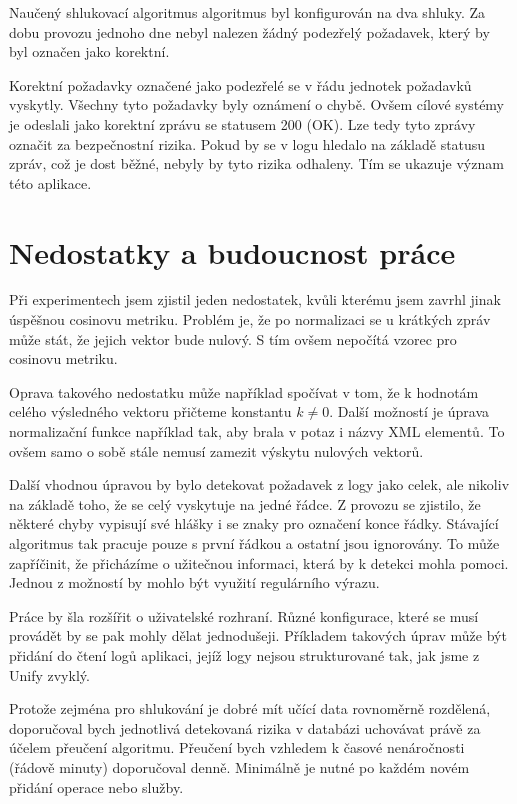 \documentclass[thesis=M,czech]{FITthesis}[2012/10/20]
\begin{document}
			Naučený shlukovací algoritmus algoritmus byl konfigurován na dva shluky. Za dobu provozu jednoho dne nebyl nalezen žádný podezřelý požadavek, který by byl označen jako korektní.
			
			Korektní požadavky označené jako podezřelé se v řádu jednotek požadavků vyskytly. Všechny tyto požadavky byly oznámení o chybě. Ovšem cílové systémy je odeslali jako korektní zprávu se statusem 200 (OK). Lze tedy tyto zprávy označit za bezpečnostní rizika. Pokud by se v logu hledalo na základě statusu zpráv, což je dost běžné, nebyly by tyto rizika odhaleny. Tím se ukazuje význam této aplikace.
		
		\section{Nedostatky a budoucnost práce}
			Při experimentech jsem zjistil jeden nedostatek, kvůli kterému jsem zavrhl jinak úspěšnou cosinovu metriku. Problém je, že po normalizaci se u krátkých zpráv může stát, že jejich vektor bude nulový. S tím ovšem nepočítá vzorec pro cosinovu metriku.
			
			Oprava takového nedostatku může například spočívat v tom, že k hodnotám celého výsledného vektoru přičteme konstantu $k \neq 0$. Další možností je úprava normalizační funkce například tak, aby brala v potaz i názvy XML elementů. To ovšem samo o sobě stále nemusí zamezit výskytu nulových vektorů.
			
			Další vhodnou úpravou by bylo detekovat požadavek z logy jako celek, ale nikoliv na základě toho, že se celý vyskytuje na jedné řádce. Z provozu se zjistilo, že některé chyby vypisují své hlášky i se znaky pro označení konce řádky. Stávající algoritmus tak pracuje pouze s první řádkou a ostatní jsou ignorovány. To může zapříčinit, že přicházíme o užitečnou informaci, která by k detekci mohla pomoci. Jednou z možností by mohlo být využití regulárního výrazu.
			
			Práce by šla rozšířit o uživatelské rozhraní. Různé konfigurace, které se musí provádět by se pak mohly dělat jednodušeji. Příkladem takových úprav může být přidání do čtení logů aplikaci, jejíž logy nejsou strukturované tak, jak jsme z Unify zvyklý. 
			
			Protože zejména pro shlukování je dobré mít učící data rovnoměrně rozdělená, doporučoval bych jednotlivá detekovaná rizika v databázi uchovávat právě za účelem přeučení algoritmu. Přeučení bych vzhledem k časové nenáročnosti (řádově minuty) doporučoval denně. Minimálně je nutné po každém novém přidání operace nebo služby.
	
\end{document}
